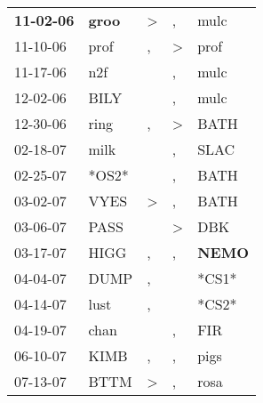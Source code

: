 \begin{supertabular}{p{0.07\textwidth}p{0.06\textwidth}p{0.02\textwidth}p{0.02\textwidth}p{0.06\textwidth}}
 \textbf{11-02-06\textsuperscript{}} &  \textbf{groo\textsuperscript{}} &     \textgreater &             , &           mulc\textsuperscript{} \\
          11-10-06\textsuperscript{} &           prof\textsuperscript{} &                , &  \textgreater &           prof\textsuperscript{} \\
          11-17-06\textsuperscript{} &            n2f\textsuperscript{} &                  &             , &           mulc\textsuperscript{} \\
          12-02-06\textsuperscript{} &           BILY\textsuperscript{} &                  &             , &           mulc\textsuperscript{} \\
          12-30-06\textsuperscript{} &           ring\textsuperscript{} &                , &  \textgreater &           BATH\textsuperscript{} \\
          02-18-07\textsuperscript{} &           milk\textsuperscript{} &                  &             , &           SLAC\textsuperscript{} \\
          02-25-07\textsuperscript{} &                            *OS2* &                  &             , &           BATH\textsuperscript{} \\
          03-02-07\textsuperscript{} &           VYES\textsuperscript{} &     \textgreater &             , &           BATH\textsuperscript{} \\
          03-06-07\textsuperscript{} &           PASS\textsuperscript{} &                  &  \textgreater &            DBK\textsuperscript{} \\
          03-17-07\textsuperscript{} &           HIGG\textsuperscript{} &                , &             , &  \textbf{NEMO\textsuperscript{}} \\
          04-04-07\textsuperscript{} &           DUMP\textsuperscript{} &                , &               &                            *CS1* \\
          04-14-07\textsuperscript{} &           lust\textsuperscript{} &                , &               &                            *CS2* \\
          04-19-07\textsuperscript{} &           chan\textsuperscript{} &                  &             , &            FIR\textsuperscript{} \\
          06-10-07\textsuperscript{} &           KIMB\textsuperscript{} &                , &             , &           pigs\textsuperscript{} \\
          07-13-07\textsuperscript{} &           BTTM\textsuperscript{} &     \textgreater &             , &           rosa\textsuperscript{} \\

\end{supertabular}
